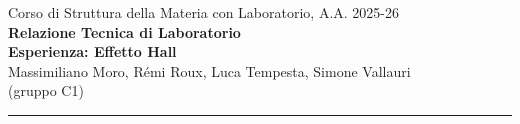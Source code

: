 \documentclass[a4paper,12pt]{article}
\begin{document}
\begin{center}

\small{Corso di Struttura della Materia con Laboratorio, A.A. 2025-26} \\
\vspace{0.4cm}
\small{\textbf{Relazione Tecnica di Laboratorio}}\\
\vspace{0.4cm}
\LARGE{\textbf{Esperienza: Effetto Hall}}
\vspace{0.4cm} \\
\normalsize{Massimiliano Moro, Rémi Roux, Luca Tempesta, Simone Vallauri} \\
\vspace{0.1cm}
\small (gruppo C1) \\

\vspace{0.1cm}
\medskip
\normalsize
\end{center}
\vspace{0.4cm}
{\color{gray}\hrule}
\medskip

\begin{abstract}
\noindent 
\end{abstract}

\tableofcontents
\clearpage

\pagestyle{fancy}
\fancyhead{} %













\clearpage

\appendix






%

%
\end{document}
